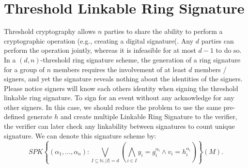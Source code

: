 \documentclass[11pt]{article}
\begin{document}
\section{Threshold Linkable Ring Signature}
Threshold cryptography allows $n$ parties to share the ability to perform a cryptographic operation (e.g., creating a digital signature(. Any $d$ parties can perform the operation jointly, whereas it is infeasible for at most $d-1$ to do so. In a $(d, n)$-threshold ring signature scheme, the generation of a ring signature for a group of $n$ members requires the involvement of at least $d$ members / signers, and yet the signature reveals nothing about the identities of the signers. 
\newline
\newline
Please notice signers will know each others identity when signing the threshold linkable ring signature. To sign for an event without any acknowledge for any other signers. In this case, we should reduce the problem to use the same pre-defined generate $h$ and create multiple Linkable Ring Signature to the verifier, the verifier can later check any linkability between signatures to count unique signature.
\newline
\newline
We can denote this signature scheme by:
\begin{equation}
SPK\left\lbrace
(\alpha_1,...,\alpha_n) : 
\bigvee_{I \subseteq \mathbb{N}, |I|=d}
\left(
\bigwedge_{i \in I}
{y_i = g_i^{\alpha_i} 
\wedge 
v_i = h_i^{\alpha_i}}
\right) 
\right\rbrace
(M).
\end{equation}
\end{document}
